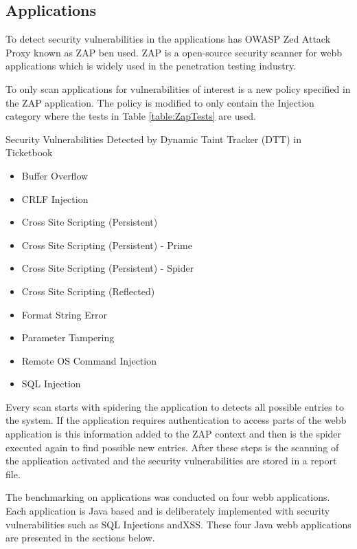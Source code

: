 \subsection{Applications}
To detect security vulnerabilities in the applications has OWASP Zed Attack Proxy \parencite{zap} known as ZAP ben used. ZAP is a open-source security scanner for webb applications which is widely used in the penetration testing industry.

To only scan applications for vulnerabilities of interest is a new policy specified in the ZAP application. The policy is modified to only contain the Injection category where the tests in Table \ref{table:ZapTests} are used.

\begin{table}[!hbt]
  \centering
  \caption{Security Vulnerabilities Detected by Dynamic Taint Tracker (DTT) in Ticketbook}
	\label{table:ZapTests}
	\begin{itemize}
		\item Buffer Overflow
		\item CRLF Injection
		\item Cross Site Scripting (Persistent)
		\item Cross Site Scripting (Persistent) - Prime
		\item Cross Site Scripting (Persistent) - Spider
		\item Cross Site Scripting (Reflected)
		\item Format String Error
		\item Parameter Tampering
		\item Remote OS Command Injection
		\item SQL Injection
	\end{itemize}
\end{table}

Every scan starts with spidering the application to detects all possible entries to the system. If the application requires authentication to access parts of the webb application is this information added to the ZAP context and then is the spider executed again to find possible new entries. After these steps is the scanning of the application activated and the security vulnerabilities are stored in a report file. 

The benchmarking on applications was conducted on four webb applications. Each application is Java based and is deliberately implemented with security vulnerabilities such as SQL Injections andXSS. These four Java webb applications are presented in the sections below.



